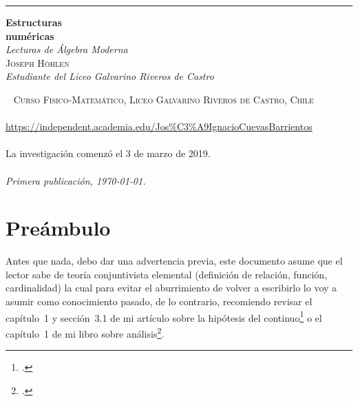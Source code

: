 \documentclass[11pt,oneside]{book}
\begin{document}
\frontmatter
\begin{titlepage}
	\raggedleft
	\rule{1pt}{\textheight}
	\hspace{0.05\textwidth}
	\parbox[b]{0.75\textwidth}{
		{\Huge\bfseries Estructuras\\[0.5\baselineskip]numéricas}\\[2\baselineskip] %
		{\large\textit{Lecturas de Álgebra Moderna}}\\[4\baselineskip] %
		{\Large\textsc{Joseph Höhlen}\\[0.5\baselineskip] \textit{Estudiante del Liceo Galvarino Riveros de Castro}} %
		\vspace{0.5\textheight}
	}
\end{titlepage}

\newpage
~\vfill
\thispagestyle{empty}
\noindent \textsc{Curso Físico-Matemático, Liceo Galvarino Riveros de Castro, Chile}\\\\
\url{https://independent.academia.edu/Jos%C3%A9IgnacioCuevasBarrientos}\\\\
La investigación comenzó el 3 de marzo de 2019.\\\\
\textit{Primera publicación, \today{}.} 

\tableofcontents

\chapter{Preámbulo}
Antes que nada, debo dar una advertencia previa, este documento asume que el lector sabe de teoría conjuntivista elemental (definición de relación, función, cardinalidad) la cual para evitar el aburrimiento de volver a escribirlo lo voy a asumir como conocimiento pasado, de lo contrario, recomiendo revisar el capítulo~1 y sección~3.1 de mi artículo sobre la hipótesis del continuo\footcite{hohlen2019infinito} o el capítulo~1 de mi libro sobre análisis\footcite{hohlen2019analisis}.
\end{document}
